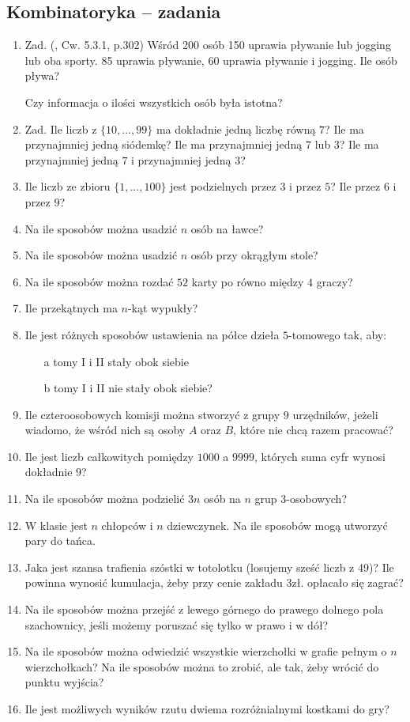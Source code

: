 \documentclass[12pt]{article}
\begin{document}
\subsection{Kombinatoryka -- zadania}
\begin{enumerate}
	\item 
	Zad. (\cite{MD}, Cw. 5.3.1, p.302)
	Wśród 200 osób 150 uprawia pływanie lub jogging lub oba sporty.
	85 uprawia pływanie, 60 uprawia pływanie i jogging. 
	Ile osób pływa?
	
	Czy informacja o ilości wszystkich osób była istotna?
	
	\item 
	Zad. 
	Ile liczb z $\{10, ..., 99\}$ ma dokładnie jedną liczbę równą $7$?
	Ile ma przynajmniej jedną siódemkę?
	Ile ma przynajmniej jedną $7$ lub $3$?
	Ile ma przynajmniej jedną $7$ i przynajmniej jedną $3$?
	
	\item 
	Ile liczb ze zbioru $\{1,...,100\}$ jest podzielnych przez $3$ i przez $5$?
	Ile przez $6$ i przez $9$?
	
	\item 
	Na ile sposobów można usadzić $n$ osób na ławce?
	\item 
	Na ile sposobów można usadzić $n$ osób przy okrągłym stole?
	\item  Na ile sposobów można rozdać $52$ karty po równo między $4$ graczy?
	\item Ile przekątnych ma $n$-kąt wypukły?
	\item Ile jest różnych sposobów ustawienia na półce dzieła $5$-tomowego tak, aby:
	\begin{itemize} 
		\item[a] tomy I i II stały obok siebie
		\item[b] tomy I i II nie stały obok siebie?
	\end{itemize} 
	\item Ile czteroosobowych komisji można stworzyć z grupy $9$ urzędników, jeżeli
	wiadomo, że wśród nich są osoby $A$ oraz $B$, które nie chcą razem pracować?
	\item Ile jest liczb całkowitych pomiędzy $1000$ a $9999$, których suma cyfr wynosi
	dokładnie $9$?
	\item  Na ile sposobów można podzielić $3n$ osób na $n$ grup $3$-osobowych?
	\item W klasie jest $n$ chłopców i $n$ dziewczynek. Na ile sposobów mogą utworzyć pary do tańca. 
	\item Jaka jest szansa trafienia szóstki w totolotku (losujemy sześć liczb z 49)? Ile powinna wynosić kumulacja, 
	żeby przy cenie zakładu 3zł. opłacało się zagrać?
	\item Na ile sposobów można przejść z lewego górnego do prawego dolnego pola szachownicy, jeśli możemy poruszać się
	tylko w prawo i w dół?
	\item Na ile sposobów można odwiedzić wszystkie wierzchołki
	w grafie pełnym o $n$ wierzchołkach? 
	Na ile sposobów można to zrobić, ale tak, żeby wrócić do punktu wyjścia?
	\item Ile jest możliwych wyników rzutu dwiema rozróżnialnymi 
	kostkami do gry?
	

\end{enumerate}
\end{document}
